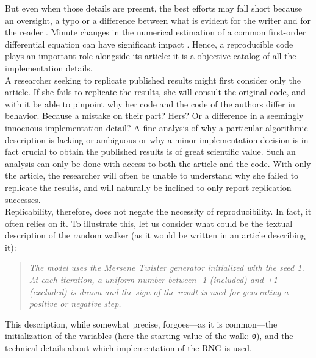 \documentclass[a4paper,11pt]{article}
\begin{document}
But even when those details are present, the best efforts may fall short because an oversight, a typo or a difference between what is evident for the writer and for the reader \citep{Mesnard:2016}. Minute changes in the numerical estimation of a common first-order differential equation can have significant impact \citep{Crook:2013}. Hence, a reproducible code plays an important role alongside its article: it is a objective catalog of all the implementation details.\\

A researcher seeking to replicate published results might first consider only the article. If she fails to replicate the results, she will consult the original code, and with it be able to pinpoint why her code and the code of the authors differ in behavior. Because a mistake on their part? Hers? Or a difference in a seemingly innocuous implementation detail? A fine analysis of why a particular algorithmic description is lacking or ambiguous or why a minor implementation decision is in fact crucial to obtain the published results is of great scientific value. Such an analysis can only be done with access to both the article and the code. With only the article, the researcher will often be unable to understand why she failed to replicate the results, and will naturally be inclined to only report replication successes.\\

Replicability, therefore, does not negate the necessity of reproducibility. In fact, it often relies on it. To illustrate this, let us consider what could be the textual description of the random walker (as it would be written in an article describing it):
%
\begin{quotation}
{\em The model uses the Mersene Twister generator initialized with the seed 1. At each iteration, a uniform number between -1 (included) and +1 (excluded) is drawn and the sign of the result is used for generating a positive or negative step.}
\end{quotation}
%
This description, while somewhat precise, forgoes---as it is common---the initialization of the variables (here the starting value of the walk: {\tt 0}), and the technical details about which implementation of the RNG is used.\\
\end{document}
